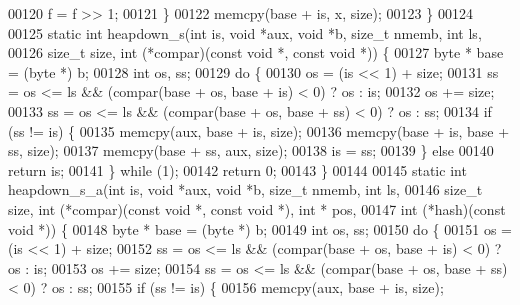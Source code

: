 \begin{DoxyCode}
00120                 f = f >> 1;
00121         \}
00122         memcpy(base + is, x, size);
00123 \}
00124 
00125 \textcolor{keyword}{static} \textcolor{keywordtype}{int} heapdown\_s(\textcolor{keywordtype}{int} is, \textcolor{keywordtype}{void} *aux, \textcolor{keywordtype}{void} *b, \textcolor{keywordtype}{size\_t} nmemb, \textcolor{keywordtype}{int} ls,
00126                 \textcolor{keywordtype}{size\_t} size, \textcolor{keywordtype}{int} (*compar)(\textcolor{keyword}{const} \textcolor{keywordtype}{void} *, \textcolor{keyword}{const} \textcolor{keywordtype}{void} *)) \{
00127         byte * base = (byte *) b;
00128         \textcolor{keywordtype}{int} os, ss;
00129         \textcolor{keywordflow}{do} \{
00130                 os = (is << 1) + size;
00131                 ss = os <= ls && (compar(base + os, base + is) < 0) ? os : is;
00132                 os += size;
00133                 ss = os <= ls && (compar(base + os, base + ss) < 0) ? os : ss;
00134                 \textcolor{keywordflow}{if} (ss != is) \{
00135                         memcpy(aux, base + is, size);
00136                         memcpy(base + is, base + ss, size);
00137                         memcpy(base + ss, aux, size);
00138                         is = ss;
00139                 \} \textcolor{keywordflow}{else}
00140                         \textcolor{keywordflow}{return} is;
00141         \} \textcolor{keywordflow}{while} (1);
00142         \textcolor{keywordflow}{return} 0;
00143 \}
00144 
00145 \textcolor{keyword}{static} \textcolor{keywordtype}{int} heapdown\_s\_a(\textcolor{keywordtype}{int} is, \textcolor{keywordtype}{void} *aux, \textcolor{keywordtype}{void} *b, \textcolor{keywordtype}{size\_t} nmemb, \textcolor{keywordtype}{int} ls,
00146                 \textcolor{keywordtype}{size\_t} size, \textcolor{keywordtype}{int} (*compar)(\textcolor{keyword}{const} \textcolor{keywordtype}{void} *, \textcolor{keyword}{const} \textcolor{keywordtype}{void} *), \textcolor{keywordtype}{int} * pos,
00147                 \textcolor{keywordtype}{int} (*hash)(\textcolor{keyword}{const} \textcolor{keywordtype}{void} *)) \{
00148         byte * base = (byte *) b;
00149         \textcolor{keywordtype}{int} os, ss;
00150         \textcolor{keywordflow}{do} \{
00151                 os = (is << 1) + size;
00152                 ss = os <= ls && (compar(base + os, base + is) < 0) ? os : is;
00153                 os += size;
00154                 ss = os <= ls && (compar(base + os, base + ss) < 0) ? os : ss;
00155                 \textcolor{keywordflow}{if} (ss != is) \{
00156                         memcpy(aux, base + is, size);

\end{DoxyCode}
